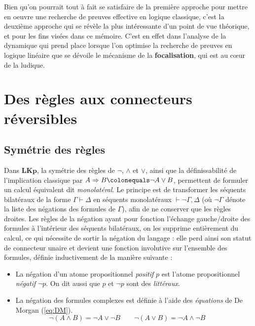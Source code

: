 \documentclass[11pt]{report}
\newcommand{\lto}{\Rightarrow}
\newcommand{\seq}{\vdash}
\begin{document}
Bien qu'on pourrait tout à fait se satisfaire de la première approche pour mettre en oeuvre une recherche de preuves effective en logique classique, c'est la deuxième approche qui se révèle la plus intéressante d'un point de vue théorique, et pour les fins visées dans ce mémoire. C'est en effet dans l'analyse de la dynamique qui prend place lorsque l'on optimise la recherche de preuves en logique linéaire que se dévoile le mécanisme de la \textbf{focalisation}, qui est au cœur de la ludique.

\chapter{Des règles aux connecteurs réversibles}

\section{Symétrie des règles}

Dans $\mathbf{LKp}$, la symétrie des règles de $\neg$, $\land$ et $\lor$, ainsi que la définissabilité de l'implication classique par $A \lto B \colonequals \neg A \lor B$, permettent de formuler un calcul équivalent dit \emph{monolatéral}. Le principe est de transformer les séquents bilatéraux de la forme $\Gamma \seq \Delta$ en séquents monolatéraux $\seq \neg \Gamma,\Delta$ (où $\neg \Gamma$ dénote la liste des négations des formules de $\Gamma$), afin de ne conserver que les règles droites. Les règles de la négation ayant pour fonction l'échange gauche/droite des formules à l'intérieur des séquents bilatéraux, on les supprime entièrement du calcul, ce qui nécessite de sortir la négation du langage : elle perd ainsi son statut de connecteur unaire et devient une fonction involutive sur l'ensemble des formules, définie inductivement de la manière suivante :

\begin{itemize}
    \item La négation d'un atome propositionnel \emph{positif} $p$ est l'atome propositionnel \emph{négatif} $\neg p$. On dit aussi que $p$ et $\neg p$ sont des \emph{littéraux}.
    \item La négation des formules complexes est définie à l'aide des \emph{équations} de De Morgan (\ref{eq:DM}).
        \begin{equation} \label{eq:DM}
            \neg (A \land B) = \neg A \lor \neg B \qquad \neg (A \lor B) = \neg A \land \neg B \qquad
        \end{equation}
\end{itemize}
\end{document}
